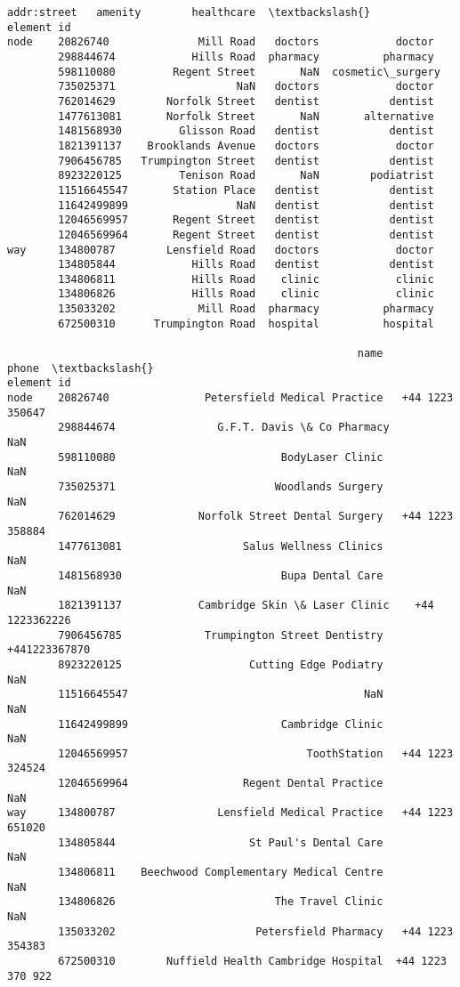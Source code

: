 \documentclass[11pt]{article}
\begin{document}
\begin{tcolorbox}[breakable, size=fbox, boxrule=.5pt, pad at break*=1mm, opacityfill=0]
\begin{Verbatim}[commandchars=\\\{\}]
                            addr:street   amenity        healthcare  \textbackslash{}
element id
node    20826740              Mill Road   doctors            doctor
        298844674            Hills Road  pharmacy          pharmacy
        598110080         Regent Street       NaN  cosmetic\_surgery
        735025371                   NaN   doctors            doctor
        762014629        Norfolk Street   dentist           dentist
        1477613081       Norfolk Street       NaN       alternative
        1481568930         Glisson Road   dentist           dentist
        1821391137    Brooklands Avenue   doctors            doctor
        7906456785   Trumpington Street   dentist           dentist
        8923220125         Tenison Road       NaN        podiatrist
        11516645547       Station Place   dentist           dentist
        11642499899                 NaN   dentist           dentist
        12046569957       Regent Street   dentist           dentist
        12046569964       Regent Street   dentist           dentist
way     134800787        Lensfield Road   doctors            doctor
        134805844            Hills Road   dentist           dentist
        134806811            Hills Road    clinic            clinic
        134806826            Hills Road    clinic            clinic
        135033202             Mill Road  pharmacy          pharmacy
        672500310      Trumpington Road  hospital          hospital

                                                       name             phone  \textbackslash{}
element id
node    20826740               Petersfield Medical Practice   +44 1223 350647
        298844674                G.F.T. Davis \& Co Pharmacy               NaN
        598110080                          BodyLaser Clinic               NaN
        735025371                         Woodlands Surgery               NaN
        762014629             Norfolk Street Dental Surgery   +44 1223 358884
        1477613081                   Salus Wellness Clinics               NaN
        1481568930                         Bupa Dental Care               NaN
        1821391137            Cambridge Skin \& Laser Clinic    +44 1223362226
        7906456785             Trumpington Street Dentistry     +441223367870
        8923220125                    Cutting Edge Podiatry               NaN
        11516645547                                     NaN               NaN
        11642499899                        Cambridge Clinic               NaN
        12046569957                            ToothStation   +44 1223 324524
        12046569964                  Regent Dental Practice               NaN
way     134800787                Lensfield Medical Practice   +44 1223 651020
        134805844                     St Paul's Dental Care               NaN
        134806811    Beechwood Complementary Medical Centre               NaN
        134806826                         The Travel Clinic               NaN
        135033202                      Petersfield Pharmacy   +44 1223 354383
        672500310        Nuffield Health Cambridge Hospital  +44 1223 370 922


\end{Verbatim}
\end{tcolorbox}
\end{document}

